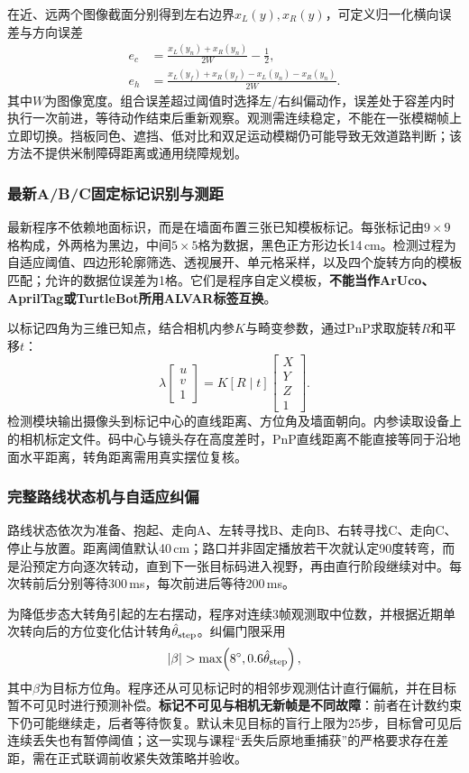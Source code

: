 在近、远两个图像截面分别得到左右边界$x_L(y),x_R(y)$，可定义归一化横向误差与方向误差
\begin{align}
e_c&=\frac{x_L(y_n)+x_R(y_n)}{2W}-\frac12,\\
e_h&=\frac{x_L(y_f)+x_R(y_f)-x_L(y_n)-x_R(y_n)}{2W}.
\end{align}
其中$W$为图像宽度。组合误差超过阈值时选择左/右纠偏动作，误差处于容差内时执行一次前进，等待动作结束后重新观察。观测需连续稳定，不能在一张模糊帧上立即切换。挡板同色、遮挡、低对比和双足运动模糊仍可能导致无效道路判断；该方法不提供米制障碍距离或通用绕障规划。

\subsubsection{最新A/B/C固定标记识别与测距}
最新程序不依赖地面标识，而是在墙面布置三张已知模板标记。每张标记由$9\times9$格构成，外两格为黑边，中间$5\times5$格为数据，黑色正方形边长14\,cm。检测过程为自适应阈值、四边形轮廓筛选、透视展开、单元格采样，以及四个旋转方向的模板匹配；允许的数据位误差为1格。它们是程序自定义模板，\textbf{不能当作ArUco、AprilTag或TurtleBot所用ALVAR标签互换}。

以标记四角为三维已知点，结合相机内参$K$与畸变参数，通过PnP求取旋转$R$和平移$t$：
\begin{equation}
\lambda\begin{bmatrix}u\\v\\1\end{bmatrix}
=K\left[R\mid t\right]\begin{bmatrix}X\\Y\\Z\\1\end{bmatrix}.
\end{equation}
检测模块输出摄像头到标记中心的直线距离、方位角及墙面朝向。内参读取设备上的相机标定文件。码中心与镜头存在高度差时，PnP直线距离不能直接等同于沿地面水平距离，转角距离需用真实摆位复核。

\subsubsection{完整路线状态机与自适应纠偏}
路线状态依次为准备、抱起、走向A、左转寻找B、走向B、右转寻找C、走向C、停止与放置。距离阈值默认40\,cm；路口并非固定播放若干次就认定90度转弯，而是沿预定方向逐次转动，直到下一张目标码进入视野，再由直行阶段继续对中。每次转前后分别等待300\,ms，每次前进后等待200\,ms。

为降低步态大转角引起的左右摆动，程序对连续3帧观测取中位数，并根据近期单次转向后的方位变化估计转角$\hat\theta_{\rm step}$。纠偏门限采用
\begin{equation}
|\beta|>\max\!\left(8^\circ,0.6\hat\theta_{\rm step}\right),
\end{equation}
其中$\beta$为目标方位角。程序还从可见标记时的相邻步观测估计直行偏航，并在目标暂不可见时进行预测补偿。\textbf{标记不可见与相机无新帧是不同故障}：前者在计数约束下仍可能继续走，后者等待恢复。默认未见目标的盲行上限为25步，目标曾可见后连续丢失也有暂停阈值；这一实现与课程“丢失后原地重捕获”的严格要求存在差距，需在正式联调前收紧失效策略并验收。


